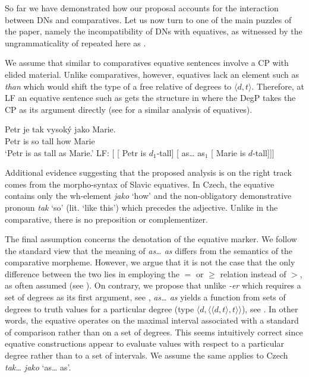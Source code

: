 \documentclass[output=paper,
modfonts,
hidelinks,
newtxmath
]{langscibook}
\begin{document}
So far we have demonstrated how our proposal accounts for the interaction between DNs and comparatives. Let us now turn to one of the main puzzles of the paper, namely the incompatibility of DNs with equatives, as witnessed by the ungrammaticality of  repeated here as .

\z

\noindent We assume that similar to comparatives equative sentences involve a CP with elided material. Unlike comparatives, however, equatives lack an element such as \textit{than} which would shift the type of a free relative of degrees to $\langle d,t\rangle$. Therefore, at LF an equative sentence such as  gets the structure in  where the DegP takes the CP as its argument directly (see \citealt{gobeski_morzycki2017percentages} for a similar analysis of equatives).

\ea \ea \gll Petr je tak vysoký jako Marie.\label{eq}\\
Petr is so tall how Marie\\
\glt `Petr is as tall as Marie.'
\ex LF: [ [ Petr is $d_1$-tall] [ as\dots{} as$_1$ [ Marie is $d$-tall]]]\label{eq-LF}
\z \z

\noindent Additional evidence suggesting that the proposed analysis is on the right track comes from the morpho-syntax of Slavic equatives. In Czech, the equative contains only the wh-element \textit{jako} `how' and the non-obligatory demonstrative pronoun \textit{tak} `so' (lit. `like this') which precedes the adjective. Unlike in the comparative, there is no preposition or complementizer. 

The final assumption concerns the denotation of the equative marker. We follow the standard view that the meaning of \textit{as\dots{} as} differs from the semantics of the comparative morpheme. However, we argue that it is not the case that the only difference between the two lies in employing the $=$ or $\geq$ relation instead of $>$, as often assumed (see \citealt{rett_measure_2015}). On contrary, we propose that unlike \textit{-er} which requires a set of degrees as its first argument, see , \textit{as\dots{} as} yields a function from sets of degrees to truth values for a particular degree (type $\langle d,\langle \langle d,t\rangle,t\rangle\rangle$), see . In other words, the equative operates on the maximal interval associated with a standard of comparison rather than on a set of degrees. This seems intuitively correct since equative constructions appear to evaluate values with respect to a particular degree rather than to a set of intervals. We assume the same applies to Czech \textit{tak\dots{} jako} `as\dots{} as'.
\end{document}
